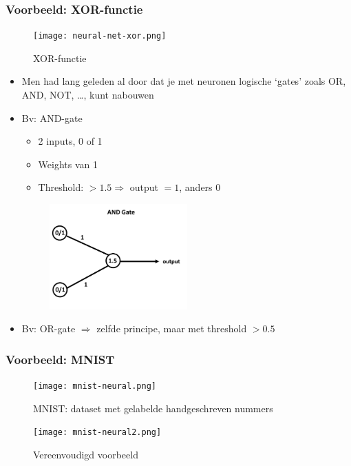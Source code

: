 \documentclass{article}
\begin{document}
\subsubsection{Voorbeeld: XOR-functie}

\begin{figure}[H]
    \centering
    \texttt{[image: neural-net-xor.png]}
    \caption{XOR-functie}
\end{figure}

\begin{itemize}
    \item Men had lang geleden al door dat je met neuronen logische `gates' zoals OR, AND, NOT, \dots, kunt nabouwen
    \item Bv: AND-gate
    \begin{itemize}
        \item 2 inputs, 0 of 1
        \item Weights van 1
        \item Threshold: $>1.5 \Rightarrow$ output $=1$, anders $0$ 
    \end{itemize}
    \begin{figure}[H]
        \centering
        \includegraphics[width=0.5\textwidth]{and-gate.png}
    \end{figure}
    \item Bv: OR-gate $\Rightarrow$ zelfde principe, maar met threshold $> 0.5$ 
\end{itemize}

\subsubsection{Voorbeeld: MNIST}

\begin{figure}[H]
    \centering
    \texttt{[image: mnist-neural.png]}
    \caption{MNIST: dataset met gelabelde handgeschreven nummers}
\end{figure}

\begin{figure}[H]
    \centering
    \texttt{[image: mnist-neural2.png]}
    \caption{Vereenvoudigd voorbeeld}
\end{figure}
\end{document}
